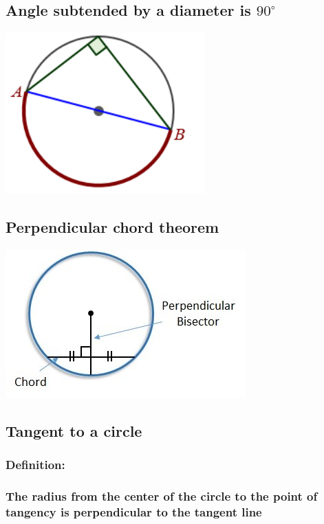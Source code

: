 \documentclass{article}
\begin{document}
\vspace{40px}

\subsection{Angle subtended by a diameter is \(90^{\circ}\)}

\includegraphics{Picture4.png}

\pagebreak

\subsection{Perpendicular chord theorem}

\includegraphics{Picture5.jpg}

\vspace{50px}

\subsection{Tangent to a circle}

\subsubsection{Definition:}
\vspace{20px}

\subsubsection{The radius from the center of the circle to the point of tangency is perpendicular to the tangent line}
\end{document}
